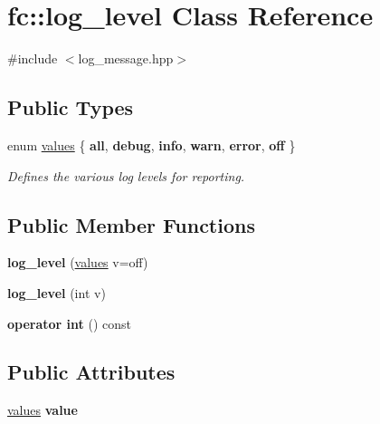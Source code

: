 \hypertarget{classfc_1_1log__level}{}\section{fc\+:\+:log\+\_\+level Class Reference}
\label{classfc_1_1log__level}


{\ttfamily \#include $<$log\+\_\+message.\+hpp$>$}

\subsection*{Public Types}
\begin{DoxyCompactItemize}
\item 
enum \mbox{\hyperlink{classfc_1_1log__level_a5a5e31c4c1f38d9115ecbe44927fb2e4}{values}} \{ \newline
{\bfseries all}, 
{\bfseries debug}, 
{\bfseries info}, 
{\bfseries warn}, 
\newline
{\bfseries error}, 
{\bfseries off}
 \}
\begin{DoxyCompactList}\small\item\em Define\textquotesingle{}s the various log levels for reporting. \end{DoxyCompactList}\end{DoxyCompactItemize}
\subsection*{Public Member Functions}
\begin{DoxyCompactItemize}
\item 
\mbox{\label{classfc_1_1log__level_ae561572fae60950899c484f3909ddbbd}} 
{\bfseries log\+\_\+level} (\mbox{\hyperlink{classfc_1_1log__level_a5a5e31c4c1f38d9115ecbe44927fb2e4}{values}} v=off)
\item 
\mbox{\label{classfc_1_1log__level_a10bca9796c4c5513369c113344a49de1}} 
{\bfseries log\+\_\+level} (int v)
\item 
\mbox{\label{classfc_1_1log__level_a34e31d7311a699c957aa7ee5e3ed292e}} 
{\bfseries operator int} () const
\end{DoxyCompactItemize}
\subsection*{Public Attributes}
\begin{DoxyCompactItemize}
\item 
\mbox{\label{classfc_1_1log__level_af8a08a5fdd2be399f80fc81707638194}} 
\mbox{\hyperlink{classfc_1_1log__level_a5a5e31c4c1f38d9115ecbe44927fb2e4}{values}} {\bfseries value}
\end{DoxyCompactItemize}


